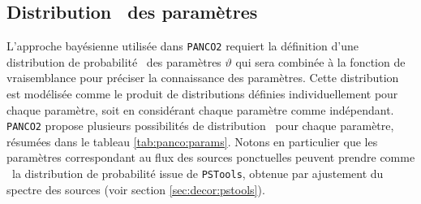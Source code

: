 \subsection{Distribution \prior\ des paramètres}
\label{sec:panco:priors}

L'approche bayésienne utilisée dans \texttt{PANCO2} requiert la définition d'une distribution de probabilité \prior\ des paramètres $\vartheta$ qui sera combinée à la fonction de vraisemblance pour préciser la connaissance des paramètres.
Cette distribution est modélisée comme le produit de distributions définies individuellement pour chaque paramètre, soit en considérant chaque paramètre comme indépendant.
\texttt{PANCO2} propose plusieurs possibilités de distribution \prior\ pour chaque paramètre, résumées dans le tableau \ref{tab:panco:params}.
Notons en particulier que les paramètres correspondant au flux des sources ponctuelles peuvent prendre comme \prior\ la distribution de probabilité issue de \texttt{PSTools}, obtenue par ajustement du spectre des sources (voir section \ref{sec:decor:pstools}).

